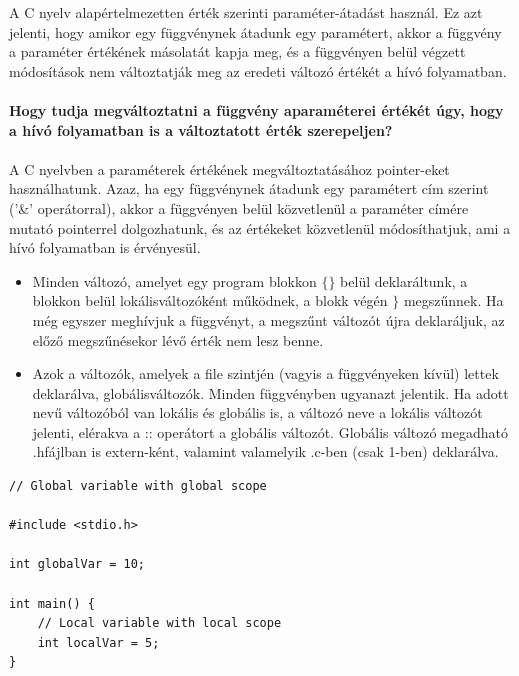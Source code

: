 \documentclass[11pt,a4paper]{article}
\begin{document}
            \begin{tcolorbox}[colback=blue!5!white,colframe=blue!50!black,title= 59. Milyen paraméter-átadást használ a C nyelv?]
                A C nyelv alapértelmezetten érték szerinti paraméter-átadást használ. Ez azt jelenti, hogy amikor egy függvénynek átadunk egy paramétert, akkor a függvény a paraméter értékének másolatát kapja meg, és a függvényen belül végzett módosítások nem változtatják meg az eredeti változó értékét a hívó folyamatban.\\ \\
                \textbf{Hogy tudja megváltoztatni a függvény aparaméterei értékét úgy, hogy a hívó folyamatban is a változtatott érték szerepeljen?}\\ \\
                A C nyelvben a paraméterek értékének megváltoztatásához pointer-eket használhatunk. Azaz, ha egy függvénynek átadunk egy paramétert cím szerint ('\&' operátorral), akkor a függvényen belül közvetlenül a paraméter címére mutató pointerrel dolgozhatunk, és az értékeket közvetlenül módosíthatjuk, ami a hívó folyamatban is érvényesül.
            \end{tcolorbox}

            \begin{tcolorbox}[colback=blue!5!white,colframe=blue!50!black,title= 60. Ismertesse a lokális és globális változó fogalmakat!]
                \begin{itemize}
                    \item Minden változó, amelyet egy program blokkon \(\{\}\) belül deklaráltunk, a blokkon belül lokálisváltozóként működnek, a blokk végén \(\}\) megszűnnek. Ha még egyszer meghívjuk a függvényt, a megszűnt változót újra deklaráljuk, az előző megszűnésekor lévő érték nem lesz benne.
                    \item Azok a változók, amelyek a file szintjén (vagyis a függvényeken kívül) lettek deklarálva, globálisváltozók. Minden függvényben ugyanazt jelentik. Ha adott nevű változóból van lokális és globális is, a változó neve a lokális változót jelenti, elérakva a :: operátort a globális változót. Globális változó megadható .hfájlban is extern-ként, valamint valamelyik .c-ben (csak 1-ben) deklarálva.
                \end{itemize}
                \begin{Verbatim}
// Global variable with global scope

#include <stdio.h>

int globalVar = 10;
                    
int main() {
    // Local variable with local scope
    int localVar = 5;
}
                \end{Verbatim}
            \end{tcolorbox}
\end{document}
